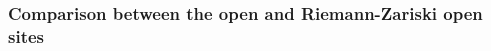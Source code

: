 \documentclass{amsart}
\def\Spa{\textrm{Spa}}
\def\Op{\textrm{Op}}
\def\RZ{\textrm{RZ}}
\theoremstyle{definition}
\newtheorem{definition}[theorem]{Definition}
\newtheorem{lemma}[theorem]{Lemma}
\numberwithin{equation}{section}
\begin{document}
	
	
	



\subsubsection*{Comparison between the open and Riemann-Zariski open sites}
 
\end{document}
